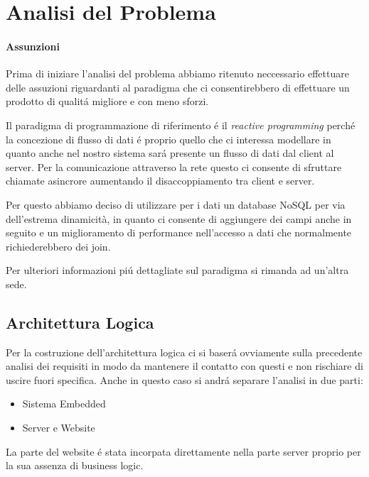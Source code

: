 \section{Analisi del Problema}

\paragraph{Assunzioni}
Prima di iniziare l'analisi del problema abbiamo ritenuto neccessario effettuare delle assuzioni riguardanti al paradigma che ci consentirebbero di effettuare un prodotto di qualit\'a migliore e con meno sforzi.

Il paradigma di programmazione di riferimento \'e il \textit{reactive programming} perch\'e la concezione di flusso di dati \'e proprio quello che ci interessa modellare in quanto anche nel nostro sistema sar\'a presente un flusso di dati dal client al server. Per la comunicazione attraverso la rete questo ci consente di sfruttare chiamate asincrore aumentando il disaccoppiamento tra client e server.

Per questo abbiamo deciso di utilizzare per i dati un database NoSQL per via dell'estrema dinamicità, in quanto ci consente di aggiungere dei campi anche in seguito e un miglioramento di performance nell'accesso a dati che normalmente richiederebbero dei join.

Per ulteriori informazioni pi\'u dettagliate sul paradigma si rimanda ad un'altra sede. 

\subsection{Architettura Logica}

Per la costruzione dell'architettura logica ci si baser\'a ovviamente sulla precedente analisi dei requisiti in modo da mantenere il contatto con questi e non rischiare di uscire fuori specifica. Anche in questo caso si andr\'a separare l'analisi in due parti:

\begin{itemize}
\item Sistema Embedded
\item Server e Website
\end{itemize}

La parte del website \'e stata incorpata direttamente nella parte server proprio per la sua assenza di business logic.


